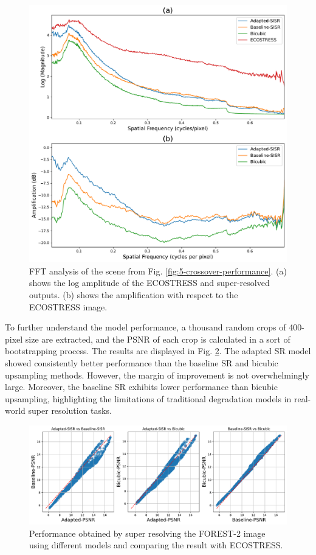     \begin{figure}[H]
        \centering
        \includegraphics[width=\textwidth]{Includes/5-crossover-performance-fft.pdf}
        \caption{FFT analysis of the scene from Fig. \ref{fig:5-crossover-performance}. (a) shows the log amplitude of the ECOSTRESS and super-resolved outputs. (b) shows the amplification with respect to the ECOSTRESS image.}
        \label{fig:5-crossover-fft}
    \end{figure}
    

    To further understand the model performance, a thousand random crops of 400-pixel size are extracted, and the PSNR of each crop is calculated in a sort of bootstrapping process. The results are displayed in Fig. \ref{fig:5-crossover-fft-scatter}. The adapted SR model showed consistently better performance than the baseline SR and bicubic upsampling methods. However, the margin of improvement is not overwhelmingly large. Moreover, the baseline SR exhibits lower performance than bicubic upsampling,  highlighting the limitations of traditional degradation models in real-world super resolution tasks.


    \begin{figure}[H]
        \centering
        \includegraphics[width=\textwidth]{Includes/5-crossover-performance-scatter.pdf}
        \caption{Performance obtained by super resolving the FOREST-2 image using different models and comparing the result with ECOSTRESS.}
        \label{fig:5-crossover-fft-scatter}
    \end{figure}
        
\newpage
    